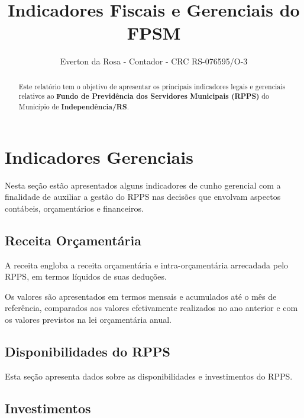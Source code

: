 \documentclass[12pt, a4paper]{article}
\title{Indicadores Fiscais e Gerenciais do FPSM}
\author{Everton da Rosa - Contador - CRC RS-076595/O-3}
\begin{document}
\maketitle

\begin{abstract}
Este relatório tem o objetivo de apresentar os principais indicadores legais e gerenciais relativos ao \textbf{Fundo de Previdência dos Servidores Municipais (RPPS)} do Município de \textbf{Independência/RS}.
\end{abstract}

\tableofcontents

\section{Indicadores Gerenciais}

Nesta seção estão apresentados alguns indicadores de cunho gerencial com a finalidade de auxiliar a gestão do RPPS nas decisões que envolvam aspectos contábeis, orçamentários e financeiros.

\subsection{Receita Orçamentária}

A receita engloba a receita orçamentária e intra-orçamentária arrecadada pelo RPPS, em termos líquidos de suas deduções.

Os valores são apresentados em termos mensais e acumulados até o mês de referência, comparados aos valores efetivamente realizados no ano anterior e com os valores previstos na lei orçamentária anual.






\subsection{Disponibilidades do RPPS}

Esta seção apresenta dados sobre as disponibilidades e investimentos do RPPS.



\subsection{Investimentos}
\end{document}
